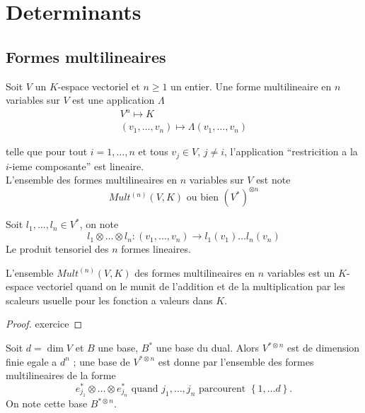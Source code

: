 \documentclass[../main.tex]{subfiles}
\begin{document}
\section{Determinants}
\subsection{Formes multilineaires}
\begin{defn}
Soit $V$ un $K$-espace vectoriel et $n\geq 1$ un entier. Une forme multilineaire en $n$ variables sur $V$ est une application $\Lambda$ 
\begin{align*}
V^{n} \mapsto K\\
( v_1,\ldots,v_n)  \mapsto \Lambda ( v_1,\ldots,v_n) 
\end{align*}

telle que pour tout $i=1,\ldots,n$ et tous $v_j\in V$, $j\neq i$, l'application ``restricition a la $i$-ieme composante'' est lineaire.\\
L'ensemble des formes multilineaires en $n$ variables sur $V$ est note
\[ 
	Mult^{( n) }( V,K)  \text{ ou bien } ( V^{*}) ^{\otimes n}
\]


\end{defn}
\begin{defn}
Soit $l_1,\ldots, l_n \in V^{*}$, on note
\[ 
	l_1 \otimes \ldots \otimes l_n : ( v_1, \ldots, v_n) \to l_1( v_1) \ldots l_n( v_n) 
\]
Le produit tensoriel des $n$ formes lineaires.
\end{defn}
\begin{propo}
	L'ensemble $Mult^{( n) }( V,K) $ des formes multilineaires en $n$ variables est un $K$-espace vectoriel quand on le munit de l'addition et de la multiplication par les scaleurs usuelle pour les fonction a valeurs dans $K$.
\end{propo}
\begin{proof}
exercice
\end{proof}
\begin{propo}
	Soit $d=\dim V$ et $B$ une base, $B^{*}$ une base du dual. Alors $V^{*\otimes n}$ est de dimension finie egale a $d^{n}$ ; une base de $V^{*\otimes n}$ est donne par l'ensemble des formes multilineaires de la forme
	\[ 
	e_{j_1} ^{*}\otimes \ldots \otimes e^{*}_{j_n} \text{ quand $j_1, \ldots, j_n$ parcourent } \left\{ 1, \ldots d \right\} .
	\]
	On note cette base $B^{*\otimes n}$.\\
	
\end{propo}
\end{document}
